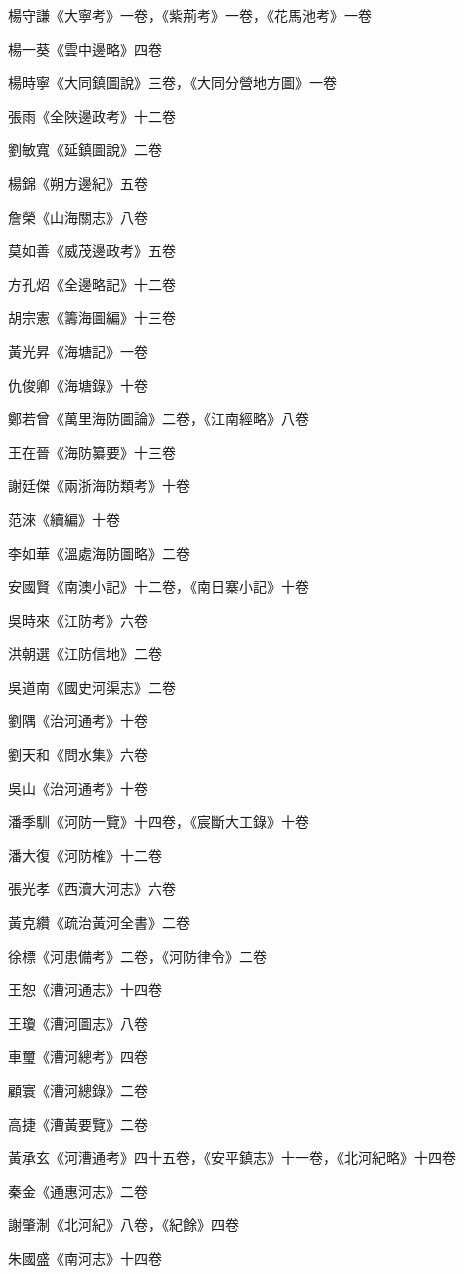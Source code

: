 楊守謙《大寧考》一卷，《紫荊考》一卷，《花馬池考》一卷

楊一葵《雲中邊略》四卷

楊時寧《大同鎮圖說》三卷，《大同分營地方圖》一卷

張雨《全陜邊政考》十二卷

劉敏寬《延鎮圖說》二卷

楊錦《朔方邊紀》五卷

詹榮《山海關志》八卷

莫如善《威茂邊政考》五卷

方孔炤《全邊略記》十二卷

胡宗憲《籌海圖編》十三卷

黃光昇《海塘記》一卷

仇俊卿《海塘錄》十卷

鄭若曾《萬里海防圖論》二卷，《江南經略》八卷

王在晉《海防纂要》十三卷

謝廷傑《兩浙海防類考》十卷

范淶《續編》十卷

李如華《溫處海防圖略》二卷

安國賢《南澳小記》十二卷，《南日寨小記》十卷

吳時來《江防考》六卷

洪朝選《江防信地》二卷

吳道南《國史河渠志》二卷

劉隅《治河通考》十卷

劉天和《問水集》六卷

吳山《治河通考》十卷

潘季馴《河防一覽》十四卷，《宸斷大工錄》十卷

潘大復《河防榷》十二卷

張光孝《西瀆大河志》六卷

黃克纘《疏治黃河全書》二卷

徐標《河患備考》二卷，《河防律令》二卷

王恕《漕河通志》十四卷

王瓊《漕河圖志》八卷

車璽《漕河總考》四卷

顧寰《漕河總錄》二卷

高捷《漕黃要覽》二卷

黃承玄《河漕通考》四十五卷，《安平鎮志》十一卷，《北河紀略》十四卷

秦金《通惠河志》二卷

謝肇淛《北河紀》八卷，《紀餘》四卷

朱國盛《南河志》十四卷

